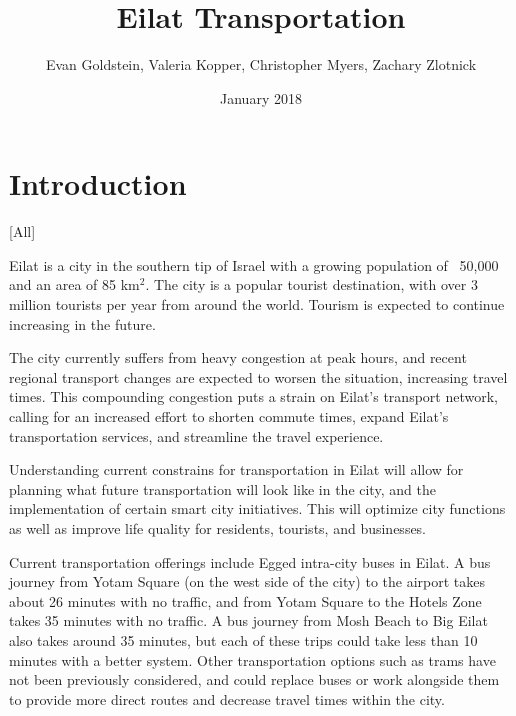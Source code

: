\documentclass[12pt]{article}                         %
\title{Eilat Transportation}
\author{Evan Goldstein, Valeria Kopper, Christopher Myers, Zachary Zlotnick}
\date{January 2018}
\begin{document}
\maketitle
\newpage

\renewcommand\abstractname{Summary} %

\tableofcontents
\newpage
\listofauthorships
\newpage
{}
\doublespacing

\section{Introduction}[All]

Eilat is a city in the southern tip of Israel with a growing population of ~50,000 and an area of 85 km$^2$. The city is a popular tourist destination, with over 3 million tourists per year from around the world. Tourism is expected to continue increasing in the future.

The city currently suffers from heavy congestion at peak hours, and recent regional transport changes are expected to worsen the situation, increasing travel times. This compounding congestion puts a strain on Eilat's transport network, calling for an increased effort to shorten commute times, expand Eilat's transportation services, and streamline the travel experience.

Understanding current constrains for transportation in Eilat will allow for planning what future transportation will look like in the city, and the implementation of certain smart city initiatives. This will optimize city functions as well as improve life quality for residents, tourists, and businesses.

Current transportation offerings include Egged intra-city buses in Eilat. A bus journey from Yotam Square (on the west side of the city) to the airport takes about 26 minutes with no traffic, and from Yotam Square to the Hotels Zone takes 35 minutes with no traffic. A bus journey from Mosh Beach to Big Eilat also takes around 35 minutes, but each of these trips could take less than 10 minutes with a better system. Other transportation options such as trams have not been previously considered, and could replace buses or work alongside them to provide more direct routes and decrease travel times within the city.

\end{document}
